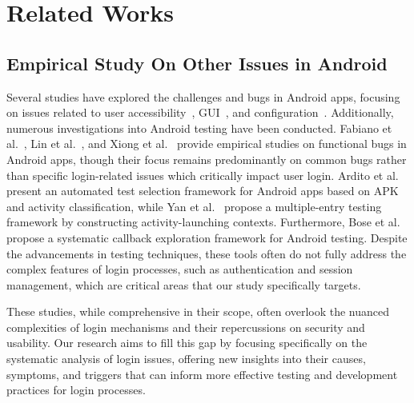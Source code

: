 \section{Related Works}
\subsection{Empirical Study On Other Issues in Android}
Several studies have explored the challenges and bugs in Android apps, focusing on issues related to user accessibility~\cite{9525343}, GUI~\cite{7965405}, and configuration~\cite{jha2019empirical}. Additionally, numerous investigations into Android testing have been conducted. Fabiano et al.~\cite{pecorelli2022software}, Lin et al.~\cite{10.1145/3324884.3416623}, and Xiong et al.~\cite{10.1145/3597926.3598138} provide empirical studies on functional bugs in Android apps, though their focus remains predominantly on common bugs rather than specific login-related issues which critically impact user login. Ardito et al.~\cite{9217524} present an automated test selection framework for Android apps based on APK and activity classification, while Yan et al.~\cite{10.1145/3377811.3380347} propose a multiple-entry testing framework by constructing activity-launching contexts. Furthermore, Bose et al.~\cite{10172528} propose a systematic callback exploration framework for Android testing. Despite the advancements in testing techniques, these tools often do not fully address the complex features of login processes, such as authentication and session management, which are critical areas that our study specifically targets. 

These studies, while comprehensive in their scope, often overlook the nuanced complexities of login mechanisms and their repercussions on security and usability. Our research aims to fill this gap by focusing specifically on the systematic analysis of login issues, offering new insights into their causes, symptoms, and triggers that can inform more effective testing and development practices for login processes.



